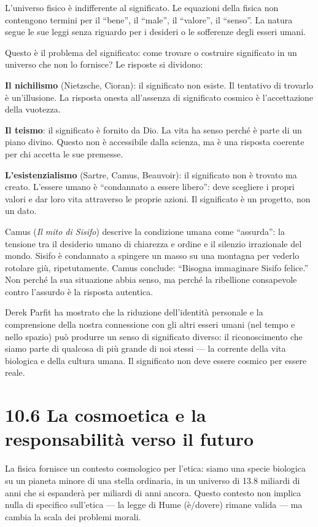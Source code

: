 \documentclass[11.5pt,a4paper,openany]{book}
\theoremstyle{remark}
\begin{document}
L'universo fisico è indifferente al significato. Le equazioni della fisica non contengono termini per il ``bene'', il ``male'', il ``valore'', il ``senso''. La natura segue le sue leggi senza riguardo per i desideri o le sofferenze degli esseri umani.

Questo è il problema del significato: come trovare o costruire significato in un universo che non lo fornisce? Le risposte si dividono:

\textbf{Il nichilismo} (Nietzsche, Cioran): il significato non esiste. Il tentativo di trovarlo è un'illusione. La risposta onesta all'assenza di significato cosmico è l'accettazione della vuotezza.

\textbf{Il teismo}: il significato è fornito da Dio. La vita ha senso perché è parte di un piano divino. Questo non è accessibile dalla scienza, ma è una risposta coerente per chi accetta le sue premesse.

\textbf{L'esistenzialismo} (Sartre, Camus, Beauvoir): il significato non è trovato ma creato. L'essere umano è ``condannato a essere libero'': deve scegliere i propri valori e dar loro vita attraverso le proprie azioni. Il significato è un progetto, non un dato.

Camus (\textit{Il mito di Sisifo}) descrive la condizione umana come ``assurda'': la tensione tra il desiderio umano di chiarezza e ordine e il silenzio irrazionale del mondo. Sisifo è condannato a spingere un masso su una montagna per vederlo rotolare giù, ripetutamente. Camus conclude: ``Bisogna immaginare Sisifo felice.'' Non perché la sua situazione abbia senso, ma perché la ribellione consapevole contro l'assurdo è la risposta autentica.

Derek Parfit ha mostrato che la riduzione dell'identità personale e la comprensione della nostra connessione con gli altri esseri umani (nel tempo e nello spazio) può produrre un senso di significato diverso: il riconoscimento che siamo parte di qualcosa di più grande di noi stessi --- la corrente della vita biologica e della cultura umana. Il significato non deve essere cosmico per essere reale.

\section{10.6 La cosmoetica e la responsabilità verso il futuro}

La fisica fornisce un contesto cosmologico per l'etica: siamo una specie biologica su un pianeta minore di una stella ordinaria, in un universo di 13.8 miliardi di anni che si espanderà per miliardi di anni ancora. Questo contesto non implica nulla di specifico sull'etica --- la legge di Hume (è/dovere) rimane valida --- ma cambia la scala dei problemi morali.
\end{document}
